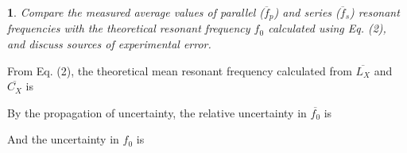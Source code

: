 \documentclass[12pt,twoside,a4paper]{article}
\theoremstyle{definition}
\newtheorem{bt}{}
\begin{document}
	\begin{bt}
		\textit{Compare the measured average values of parallel ($\overline{f}_p$) and series ($\overline{f}_s$) resonant frequencies with the theoretical resonant frequency $f_0$ calculated using Eq. (2), and discuss sources of experimental error.}
		
		\vspace{0.2cm}
		\noindent
		From Eq. (2), the theoretical mean resonant frequency calculated from $\overline{L_X}$ and $\overline{C_X}$ is
		\begin{center}
		\end{center}
		
		\noindent
		By the propagation of uncertainty, the relative uncertainty in $\overline{f_0}$ is
		\begin{center}
		\end{center}
		
		\noindent
		And the uncertainty in $f_0$ is
		\begin{center}
		\end{center}
		

\end{bt}
\end{document}
